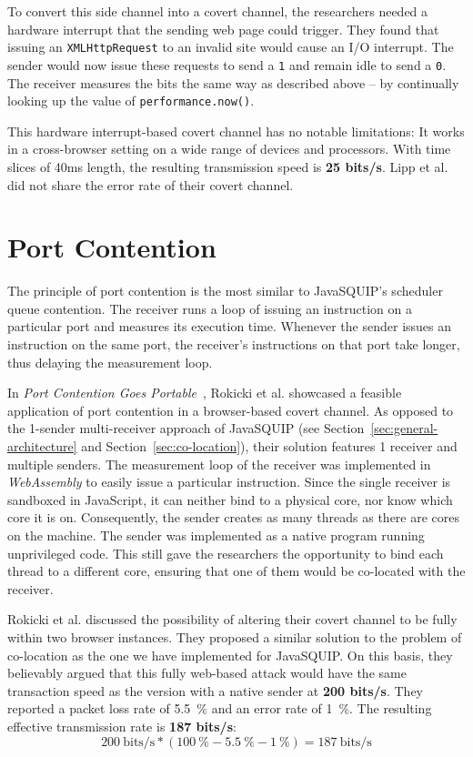 \documentclass[11pt,
  titlepage=false,
  parskip=half,      %
]{scrreprt}
\begin{document}
To convert this side channel into a covert channel,
the researchers needed a hardware interrupt that the sending web page could trigger.
They found that issuing an \texttt{XMLHttpRequest} to an invalid site would cause an I/O interrupt.
The sender would now issue these requests to send a \texttt{1} and remain idle to send a \texttt{0}.
The receiver measures the bits the same way as described above --
by continually looking up the value of \texttt{performance.now()}.

This hardware interrupt-based covert channel has no notable limitations:
It works in a cross-browser setting on a wide range of devices and processors.
With time slices of 40ms length, the resulting transmission speed is \textbf{25 bits/s}.
Lipp et al. did not share the error rate of their covert channel.

\section{Port Contention}
The principle of port contention is the most similar to JavaSQUIP's scheduler queue contention.
The receiver runs a loop of issuing an instruction on a particular port and measures its execution time.
Whenever the sender issues an instruction on the same port, the receiver's instructions on that port take longer,
thus delaying the measurement loop.

In \textit{Port Contention Goes Portable}~\cite{Rokicki2022webport},
Rokicki et al. showcased a feasible application of port contention in a browser-based covert channel.
As opposed to the 1-sender multi-receiver approach of JavaSQUIP (see Section~\ref{sec:general-architecture} and Section~\ref{sec:co-location}),
their solution features 1 receiver and multiple senders.
The measurement loop of the receiver was implemented in \textit{WebAssembly} to easily issue a particular instruction.
Since the single receiver is sandboxed in JavaScript, it can neither bind to a physical core, nor know which core it is on.
Consequently, the sender creates as many threads as there are cores on the machine.
The sender was implemented as a native program running unprivileged code.
This still gave the researchers the opportunity to bind each thread to a different core,
ensuring that one of them would be co-located with the receiver.

Rokicki et al. discussed the possibility of altering their covert channel to be fully within two browser instances.
They proposed a similar solution to the problem of co-location as the one we have implemented for JavaSQUIP.
On this basis, they believably argued that this fully web-based attack would have the same transaction speed as the version
with a native sender at \textbf{200 bits/s}.
They reported a packet loss rate of 5.5~\% and an error rate of 1~\%.
The resulting effective transmission rate is \textbf{187 bits/s}:
\[200~\text{bits/s} * (100~\% - 5.5~\% - 1~\%) = 187~\text{bits/s}\]
\end{document}

